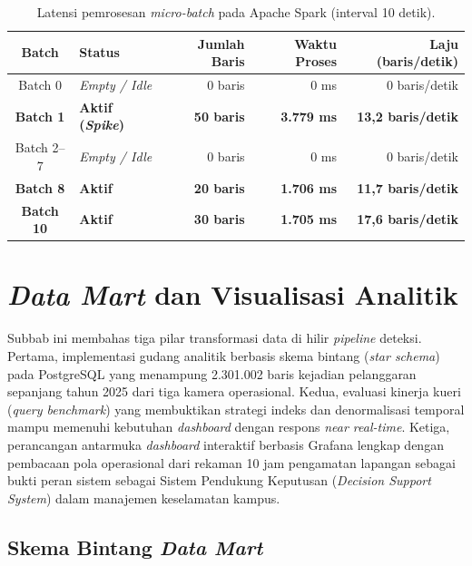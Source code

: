 \begin{table}[htbp]
\centering
\caption{Latensi pemrosesan \textit{micro-batch} pada Apache Spark (interval 10 detik).}
\label{tab:spark-microbatch}
\small
\setlength{\tabcolsep}{4pt}
\begin{tabularx}{\textwidth}{c>{\RaggedRight\arraybackslash}Xrrr}
\toprule
\textbf{Batch} & \textbf{Status} & \textbf{Jumlah Baris} & \textbf{Waktu Proses} & \textbf{Laju (baris/detik)} \\
\midrule
Batch 0 & \textit{Empty / Idle} & 0 baris & 0 ms & 0 baris/detik \\
\textbf{Batch 1} & \textbf{Aktif (\textit{Spike})} & \textbf{50 baris} & \textbf{3.779 ms} & \textbf{13,2 baris/detik} \\
Batch 2--7 & \textit{Empty / Idle} & 0 baris & 0 ms & 0 baris/detik \\
\textbf{Batch 8} & \textbf{Aktif} & \textbf{20 baris} & \textbf{1.706 ms} & \textbf{11,7 baris/detik} \\
\textbf{Batch 10} & \textbf{Aktif} & \textbf{30 baris} & \textbf{1.705 ms} & \textbf{17,6 baris/detik} \\
\bottomrule
\end{tabularx}
\end{table}

\section{\textit{Data Mart} dan Visualisasi Analitik}
\label{sec:data-mart}

Subbab ini membahas tiga pilar transformasi data di hilir \textit{pipeline} deteksi. Pertama, implementasi gudang analitik berbasis skema bintang (\textit{star schema}) pada PostgreSQL yang menampung 2.301.002 baris kejadian pelanggaran sepanjang tahun 2025 dari tiga kamera operasional. Kedua, evaluasi kinerja kueri (\textit{query benchmark}) yang membuktikan strategi indeks dan denormalisasi temporal mampu memenuhi kebutuhan \textit{dashboard} dengan respons \textit{near real-time}. Ketiga, perancangan antarmuka \textit{dashboard} interaktif berbasis Grafana lengkap dengan pembacaan pola operasional dari rekaman 10 jam pengamatan lapangan sebagai bukti peran sistem sebagai Sistem Pendukung Keputusan (\textit{Decision Support System}) dalam manajemen keselamatan kampus.

% 
\subsection{Skema Bintang \textit{Data Mart}}
\label{subsec:implementasi-star-schema}
% 

